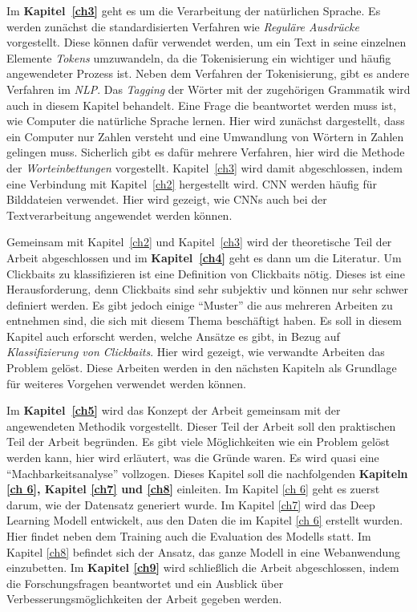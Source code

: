 Im \textbf{Kapitel~\ref{ch3}} geht es um die Verarbeitung der natürlichen Sprache. Es werden zunächst die standardisierten Verfahren wie \textit{Reguläre Ausdrücke} vorgestellt. Diese können dafür verwendet werden, um ein Text in seine einzelnen Elemente \textit{Tokens} umzuwandeln, da die Tokenisierung ein wichtiger und häufig angewendeter Prozess ist. Neben dem Verfahren der Tokenisierung, gibt es andere Verfahren im \textit{NLP}. Das \textit{Tagging} der Wörter mit der zugehörigen Grammatik wird auch in diesem Kapitel behandelt. Eine Frage die beantwortet werden muss ist, wie Computer die natürliche Sprache lernen. Hier wird zunächst dargestellt, dass ein Computer nur Zahlen versteht und eine Umwandlung von Wörtern in Zahlen gelingen muss. Sicherlich gibt es dafür mehrere Verfahren, hier wird die Methode der \textit{Worteinbettungen} vorgestellt. Kapitel~\ref{ch3} wird damit abgeschlossen, indem eine Verbindung mit Kapitel~\ref{ch2} hergestellt wird. CNN werden häufig für Bilddateien verwendet. Hier wird gezeigt, wie CNNs auch bei der Textverarbeitung angewendet werden können.

Gemeinsam mit Kapitel~\ref{ch2} und Kapitel~\ref{ch3} wird der theoretische Teil der Arbeit abgeschlossen und im \textbf{Kapitel~\ref{ch4}} geht es dann um die Literatur. Um Clickbaits zu klassifizieren ist eine Definition von Clickbaits nötig. Dieses ist eine Herausforderung, denn Clickbaits sind sehr subjektiv und können nur sehr schwer definiert werden. Es gibt jedoch einige \enquote{Muster} die aus mehreren Arbeiten zu entnehmen sind, die sich mit diesem Thema beschäftigt haben. Es soll in diesem Kapitel auch erforscht werden, welche Ansätze es gibt, in Bezug auf \textit{Klassifizierung von Clickbaits}. Hier wird gezeigt, wie verwandte Arbeiten das Problem gelöst. Diese Arbeiten werden in den nächsten Kapiteln als Grundlage für weiteres Vorgehen verwendet werden können.



Im \textbf{Kapitel~\ref{ch5}} wird das Konzept der Arbeit gemeinsam mit der angewendeten Methodik vorgestellt. Dieser Teil der Arbeit soll den praktischen Teil der Arbeit begründen. Es gibt viele Möglichkeiten wie ein Problem gelöst werden kann, hier wird erläutert, was die Gründe waren. Es wird quasi eine \enquote{Machbarkeitsanalyse} vollzogen. Dieses Kapitel soll die nachfolgenden \textbf{Kapiteln \ref{ch 6}, Kapitel \ref{ch7} und \ref{ch8}} einleiten.  Im Kapitel \ref{ch 6} geht es zuerst darum, wie der Datensatz generiert wurde. Im Kapitel \ref{ch7} wird das Deep Learning Modell entwickelt, aus den Daten die im Kapitel \ref{ch 6} erstellt wurden. Hier findet neben dem Training auch die Evaluation des Modells statt. Im Kapitel \ref{ch8} befindet sich der Ansatz, das ganze Modell in eine Webanwendung einzubetten. Im \textbf{Kapitel \ref{ch9}} wird schließlich die Arbeit abgeschlossen, indem die Forschungsfragen beantwortet und ein Ausblick über Verbesserungsmöglichkeiten der Arbeit gegeben werden.